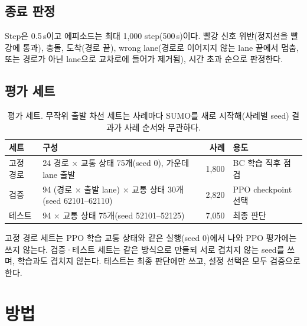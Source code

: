 \documentclass[10pt,a4paper]{article}
\begin{document}
\subsection{종료 판정}
Step은 0.5\,s이고 에피소드는 최대 1,000 step(500\,s)이다. 빨강 신호 위반(정지선을 빨강에 통과), 충돌, 도착(경로 끝), wrong lane(경로로 이어지지 않는 lane 끝에서 멈춤, 또는 경로가 아닌 lane으로 교차로에 들어가 제거됨), 시간 초과 순으로 판정한다.

\subsection{평가 세트}\label{sec:suites}
\begin{table}[h]
\centering
\caption{평가 세트. 무작위 출발 차선 세트는 사례마다 SUMO를 새로 시작해(사례별 seed) 결과가 사례 순서와 무관하다.}
\label{tab:suites}
\small
\begin{tabularx}{\linewidth}{@{}lLrl@{}}
\toprule
세트 & 구성 & 사례 & 용도 \\
\midrule
고정 경로 & 24 경로 $\times$ 교통 상태 75개(seed 0), 가운데 lane 출발 & 1,800 & BC 학습 직후 점검 \\
검증 & 94 (경로 $\times$ 출발 lane) $\times$ 교통 상태 30개(seed 62101--62110) & 2,820 & PPO checkpoint 선택 \\
테스트 & 94 $\times$ 교통 상태 75개(seed 52101--52125) & 7,050 & 최종 판단 \\
\bottomrule
\end{tabularx}
\end{table}
고정 경로 세트는 PPO 학습 교통 상태와 같은 실행(seed 0)에서 나와 PPO 평가에는 쓰지 않는다. 검증·테스트 세트는 같은 방식으로 만들되 서로 겹치지 않는 seed를 쓰며, 학습과도 겹치지 않는다. 테스트는 최종 판단에만 쓰고, 설정 선택은 모두 검증으로 한다.

\section{방법}
\end{document}
